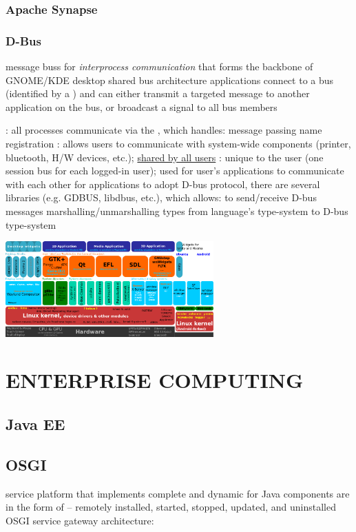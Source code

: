 \documentclass{myproc}
\begin{document}
\subsubsection{Apache Synapse}
\subsubsection{D-Bus}
\bit
\w {} message buss for {\em interprocess communication\/} that
forms the backbone of GNOME/KDE desktop
\w shared bus architecture
\w applications connect to a bus (identified by a ) and can
either transmit a targeted message to another application on the bus, or
broadcast a signal to all bus members

\w {}: all processes communicate via the ,
which handles:
  \ben
  \w [(a)] message passing
  \w [(b)] name registration
  \een
\w {}
  \bit
  \w {}: allows users to communicate with system-wide components
  (printer, bluetooth, H/W devices, etc.); \underline{shared by all users}
  \w {}: unique to the user (one session bus for each logged-in
  user); used for user's applications to communicate with each other
  \eit
\w for applications to adopt D-bus protocol, there are several libraries
(e.g. GDBUS, libdbus, etc.), which allows:
   \bit
   \w to send/receive D-bus messages
   \w marshalling/unmarshalling types from language's  type-system to D-bus type-system
   \eit
\eit

\centerline{\includegraphics[width=8cm]{pics/d-bus}}


\section{ENTERPRISE COMPUTING}
\subsection{Java EE}
\subsection{OSGI}
\bit
\w service platform that implements complete and dynamic 
for Java
\w components are in the form of  -- remotely
installed, started, stopped, updated, and uninstalled
\w OSGI service gateway architecture:\\
\end{document}
